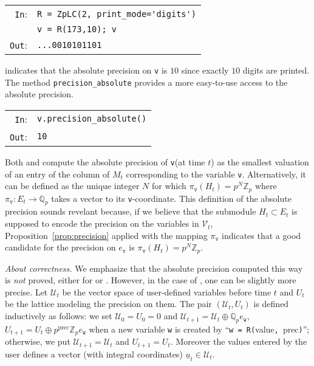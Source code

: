 \documentclass[sigconf]{acmart}
\newcommand{\Z}{\mathbb Z}
\newcommand{\Zp}{\Z_p}
\newcommand{\Q}{\mathbb Q}
\newcommand{\Qp}{\Q_p}
\newcommand{\calV}{\mathcal{V}}
\newcommand{\ttv}{\texttt{v}\xspace}
\newcommand{\ttw}{\texttt{w}\xspace}
\newcommand{\calU}{\mathcal{U}}
\newcommand{\ZpLC}{\text{\rm \tt ZpLC}\xspace}
\newcommand{\ZpLF}{\text{\rm \tt ZpLF}\xspace}
\newcommand{\cIn}{{\color{blue} \tt \phantom{Zp}In}:}
\newcommand{\cOut}{{\color{red} \tt \phantom{Z}Out}:}
\theoremstyle{definition}
\begin{document}
\smallskip

\noindent
\begin{tabular}{rl}
\cIn  & \verb?R = ZpLC(2, print_mode='digits')? \\
      & \verb?v = R(173,10); v? \\
\cOut & \verb?...0010101101?
\end{tabular}

\smallskip

\noindent
indicates that the absolute precision on \ttv is $10$ since
exactly $10$ digits are printed.
The method \verb?precision_absolute? provides a more easy-to-use
access to the absolute precision.

\smallskip

\noindent
\begin{tabular}{rl}
\cIn  & \verb?v.precision_absolute()? \\
\cOut & \verb?10?
\end{tabular}

\smallskip

\noindent
Both \ZpLC and \ZpLF compute the absolute precision of \ttv (at time 
$t$) as the smallest valuation of an entry of the column of $M_t$ 
corresponding to the variable \ttv. Alternatively, it can be defined as 
the unique integer $N$ for which $\pi_\ttv(H_t) = p^N \Zp$ where 
$\pi_\ttv : E_t \to \Qp$ takes a vector to its \ttv-coordinate.
This definition of the absolute precision sounds revelant because, if we 
believe that the submodule $H_t \subset E_t$ is supposed to encode the 
precision on the variables in $\calV_t$, 
Proposition~\ref{prop:precision} applied with the mapping $\pi_\ttv$ 
indicates that a good candidate for the precision on $e_\ttv$ is 
$\pi_\ttv(H_t) = p^N \Zp$.

\medskip

\noindent \textit{About correctness.}
%
We emphasize that the absolute precision computed this way is \emph{not} 
proved, either for \ZpLF or \ZpLC. However, in the case of \ZpLC, one
can be slightly more precise. Let $\calU_t$ be the vector space of 
user-defined variables before time $t$ and $U_t$ be the lattice
modeling the precision on them. The pair $(\calU_t, U_t)$ is defined 
inductively as follows: we set $\calU_0 = U_0 = 0$ and 
$\calU_{t+1} = \calU_t \oplus \Qp e_\ttw$,
$U_{t+1} = U_t \oplus p^{\text{prec}} \Zp e_\ttw$
when a new variable \ttw is created by
``\verb?w = R(?value\verb?, ?prec\verb?)?''; otherwise, we put 
$\calU_{t+1} = \calU_t$ and $U_{t+1} = U_t$. Moreover the values
entered by the user defines a vector (with integral coordinates)
$\underline u_t \in \calU_t$.
\end{document}
